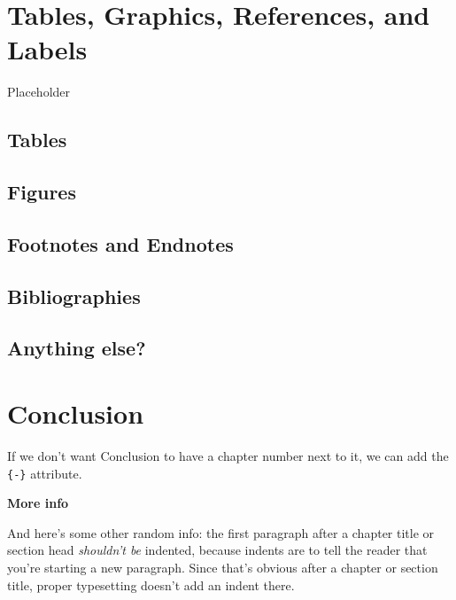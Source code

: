 \documentclass[12pt,twoside]{reedthesis}
\begin{document}
\hypertarget{ref-labels}{%
\chapter{Tables, Graphics, References, and Labels}\label{ref-labels}}

Placeholder

\hypertarget{tables}{%
\section{Tables}\label{tables}}

\hypertarget{figures}{%
\section{Figures}\label{figures}}

\hypertarget{footnotes-and-endnotes}{%
\section{Footnotes and Endnotes}\label{footnotes-and-endnotes}}

\hypertarget{bibliographies}{%
\section{Bibliographies}\label{bibliographies}}

\hypertarget{anything-else}{%
\section{Anything else?}\label{anything-else}}

\hypertarget{conclusion}{%
\chapter*{Conclusion}\label{conclusion}}

If we don't want Conclusion to have a chapter number next to it, we can add the \texttt{\{-\}} attribute.

\textbf{More info}

And here's some other random info: the first paragraph after a chapter title or section head \emph{shouldn't be} indented, because indents are to tell the reader that you're starting a new paragraph. Since that's obvious after a chapter or section title, proper typesetting doesn't add an indent there.

\appendix
\end{document}
